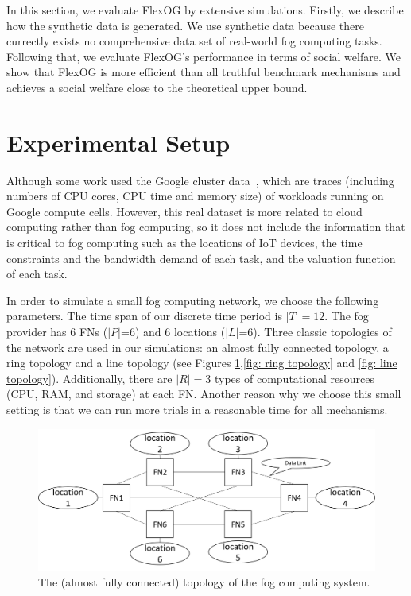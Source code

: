 \documentclass[11pt]{phdthesis}
\begin{document}
In this section, we evaluate FlexOG by extensive simulations. Firstly, we describe how the synthetic data is generated. We use synthetic data because there currectly exists no comprehensive data set of real-world fog computing tasks. Following that, we evaluate FlexOG's performance in terms of social welfare. We show that FlexOG is more efficient than all truthful benchmark mechanisms and achieves a social welfare close to the theoretical upper bound. 

\section{Experimental Setup} \label{experimental setup}

Although some work used the Google cluster data~\citep{shi2015shapley,shi2017online,zhang2015truthful}, which are traces (including numbers of CPU cores, CPU time and memory size) of workloads running on Google compute cells. However, this real dataset is more related to cloud computing rather than fog computing, so it does not include the information that is critical to fog computing such as the locations of IoT devices, the time constraints and the bandwidth demand of each task, and the valuation function of each task. 

In order to simulate a small fog computing network, we choose the following parameters. The time span of our discrete time period is $|T| = 12$. The fog provider has 6 FNs ($|P|$=6) and 6 locations ($|L|$=6). Three classic topologies of the network are used in our simulations: an almost fully connected topology, a ring topology and a line topology (see Figures \ref{fig: all connected topology},\ref{fig: ring topology} and \ref{fig: line topology}). Additionally, there are $|R|= 3$ types of computational resources (CPU, RAM, and storage) at each FN. Another reason why we choose this small setting is that we can run more trials in a reasonable time for all mechanisms.

\begin{figure}
    \centering
    \includegraphics[width=1.0\textwidth]{./Figures/system_topology_allConnected.png}
    \caption{\label{fig: all connected topology}The (almost fully connected) topology of the fog computing system.}
\end{figure}
\end{document}
